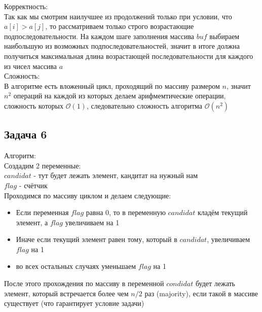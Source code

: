 \documentclass[a4paper,12pt]{article} %
\begin{document}
Корректность:\\
Так как мы смотрим наилучшее из продолжений только при условии, что $ a[i] > a[j] $, то рассматриваем только строго возрастающие подпоследовательности. На каждом шаге заполнения массива $ buf $ выбираем наибольшую из возможных подпоследовательностей, значит в итоге должна получиться максимальная длина возрастающей последовательности для каждого из чисел массива $ a $\\

Сложность:\\
В алгоритме есть вложенный цикл, проходящий по массиву размером $ n $, значит $ n^2 $ операций на каждой из которых делаем арифмемтические операции, сложность которых $\mathcal{O}(1)$, следовательно сложность алгоритма $\mathcal{O}(n^2)$

\subsection*{Задача 6}
Алгоритм:\\
Создадим 2 переменные:\\
$candidat$ - тут будет лежать элемент, кандитат на нужный нам\\
$flag$ - счётчик\\

Проходимся по массиву циклом и делаем следующие:\\

\begin{itemize}
\item Если переменная $flag$ равна 0, то в переменную $candidat$ кладём текущий элемент, а $flag$ увеличиваем на 1
\item Иначе если текущий элемент равен тому, который в $candidat$, увеличиваем $flag$ на 1
\item во всех остальных случаях уменьшаем $flag$ на 1
\end{itemize}

После этого прохождения по массиву в переменной $condidat$ будет лежать элемент, который встречается более чем $n/2$ раз (majority), если такой в массиве существует (что гарантирует условие задачи)
\end{document}
